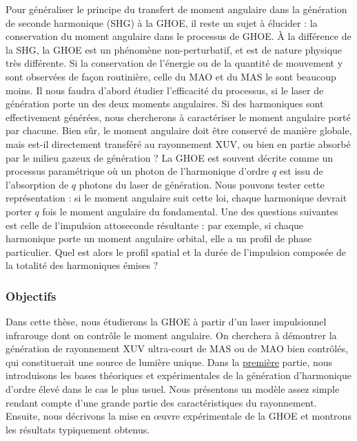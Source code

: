 Pour généraliser le principe du transfert de moment angulaire dans la génération de seconde harmonique (SHG) à la GHOE, il reste un sujet à élucider : la conservation du moment angulaire dans le processus de GHOE. \`A la différence de la SHG, la GHOE est un phénomène non-perturbatif, et est de nature physique très différente. Si la conservation de l'énergie ou de la quantité de mouvement y sont observées de façon routinière, celle du MAO et du MAS le sont beaucoup moins. Il nous faudra d'abord étudier l'efficacité du processus, si le laser de génération porte un des deux moments angulaires. Si des harmoniques sont effectivement générées, nous chercherons à caractériser le moment angulaire porté par chacune. Bien sûr, le moment angulaire doit être conservé de manière globale, mais est-il directement transféré au rayonnement XUV, ou bien en partie absorbé par le milieu gazeux de génération ? La GHOE est souvent décrite comme un processus paramétrique où un photon de l'harmonique d'ordre $q$ est issu de l'absorption de $q$ photons du laser de génération. Nous pouvons tester cette représentation : si le moment angulaire suit cette loi, chaque harmonique devrait porter $q$ fois le moment angulaire du fondamental. Une des questions suivantes est celle de l'impulsion attoseconde résultante : par exemple, si chaque harmonique porte un moment angulaire orbital, elle a un profil de phase particulier. Quel est alors le profil spatial et la durée de l'impulsion composée de la totalité des harmoniques émises ? 

\subsubsection{Objectifs}
Dans cette thèse, nous étudierons la GHOE à partir d'un laser impulsionnel infrarouge dont on contrôle le moment angulaire. On cherchera à démontrer la génération de rayonnement XUV ultra-court de MAS ou de MAO bien contrôlés, qui constituerait une source de lumière unique. Dans la \hyperref[PA:GHOE]{première} partie, nous introduisons les bases théoriques et expérimentales de la génération d'harmonique d'ordre élevé dans le cas le plus usuel. Nous présentons un modèle assez simple rendant compte d'une grande partie des caractéristiques du rayonnement. Ensuite, nous décrivons la mise en œuvre expérimentale de la GHOE et montrons les résultats typiquement obtenus.

